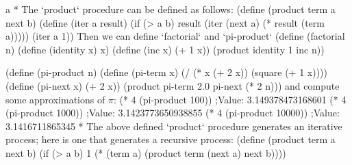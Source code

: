 \begitems\style a
* The `product` procedure can be defined as follows:
\begtt\scm
(define (product term a next b)
  (define (iter a result)
    (if (> a b)
        result
        (iter (next a) (* result (term a)))))
  (iter a 1))
\endtt
Then we can define `factorial` and `pi-product`
\begtt\scm
(define (factorial n)
  (define (identity x) x)
  (define (inc x) (+ 1 x))
  (product identity 1 inc n))

(define (pi-product n)
  (define (pi-term x)
    (/ (* x (+ 2 x))
       (square (+ 1 x))))
  (define (pi-next x)
    (+ 2 x))
  (product pi-term 2.0 pi-next (* 2 n)))
\endtt
and compute some approximations of $\pi$:
\begtt\scm
(* 4 (pi-product 100))
;Value: 3.149378473168601
(* 4 (pi-product 1000))
;Value: 3.1423773650938855
(* 4 (pi-product 10000))
;Value: 3.1416711865345
\endtt
* The above defined `product` procedure generates an iterative process;  here is one that generates a recursive process:
\begtt\scm
(define (product term a next b)
  (if (> a b)
      1
      (* (term a)
         (product term (next a) next b))))
\endtt
\enditems
